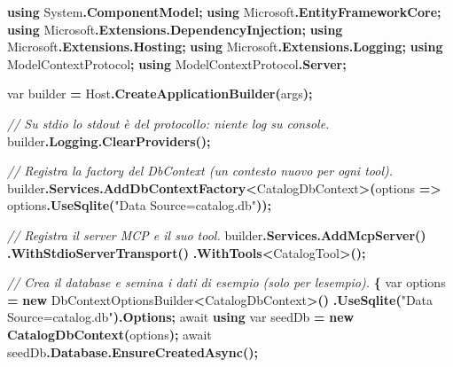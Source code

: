 \documentclass[
  italian,
  10pt,
]{book}
\newenvironment{Shaded}{\begin{snugshade}}{\end{snugshade}}
\newcommand{\CommentTok}[1]{\textcolor[rgb]{0.56,0.35,0.01}{\textit{#1}}}
\newcommand{\DataTypeTok}[1]{\textcolor[rgb]{0.13,0.29,0.53}{#1}}
\newcommand{\FunctionTok}[1]{\textcolor[rgb]{0.13,0.29,0.53}{\textbf{#1}}}
\newcommand{\KeywordTok}[1]{\textcolor[rgb]{0.13,0.29,0.53}{\textbf{#1}}}
\newcommand{\NormalTok}[1]{#1}
\newcommand{\OperatorTok}[1]{\textcolor[rgb]{0.81,0.36,0.00}{\textbf{#1}}}
\newcommand{\StringTok}[1]{\textcolor[rgb]{0.31,0.60,0.02}{#1}}
\begin{document}
\begin{Shaded}
\begin{Highlighting}[]
\KeywordTok{using}\NormalTok{ System}\OperatorTok{.}\FunctionTok{ComponentModel}\OperatorTok{;}
\KeywordTok{using}\NormalTok{ Microsoft}\OperatorTok{.}\FunctionTok{EntityFrameworkCore}\OperatorTok{;}
\KeywordTok{using}\NormalTok{ Microsoft}\OperatorTok{.}\FunctionTok{Extensions}\OperatorTok{.}\FunctionTok{DependencyInjection}\OperatorTok{;}
\KeywordTok{using}\NormalTok{ Microsoft}\OperatorTok{.}\FunctionTok{Extensions}\OperatorTok{.}\FunctionTok{Hosting}\OperatorTok{;}
\KeywordTok{using}\NormalTok{ Microsoft}\OperatorTok{.}\FunctionTok{Extensions}\OperatorTok{.}\FunctionTok{Logging}\OperatorTok{;}
\KeywordTok{using}\NormalTok{ ModelContextProtocol}\OperatorTok{;}
\KeywordTok{using}\NormalTok{ ModelContextProtocol}\OperatorTok{.}\FunctionTok{Server}\OperatorTok{;}

\DataTypeTok{var}\NormalTok{ builder }\OperatorTok{=}\NormalTok{ Host}\OperatorTok{.}\FunctionTok{CreateApplicationBuilder}\OperatorTok{(}\NormalTok{args}\OperatorTok{);}

\CommentTok{// Su stdio lo stdout è del protocollo: niente log su console.}
\NormalTok{builder}\OperatorTok{.}\FunctionTok{Logging}\OperatorTok{.}\FunctionTok{ClearProviders}\OperatorTok{();}

\CommentTok{// Registra la factory del DbContext (un contesto nuovo per ogni tool).}
\NormalTok{builder}\OperatorTok{.}\FunctionTok{Services}\OperatorTok{.}\FunctionTok{AddDbContextFactory}\OperatorTok{\textless{}}\NormalTok{CatalogDbContext}\OperatorTok{\textgreater{}(}\NormalTok{options }\OperatorTok{=\textgreater{}}
\NormalTok{    options}\OperatorTok{.}\FunctionTok{UseSqlite}\OperatorTok{(}\StringTok{"Data Source=catalog.db"}\OperatorTok{));}

\CommentTok{// Registra il server MCP e il suo tool.}
\NormalTok{builder}\OperatorTok{.}\FunctionTok{Services}\OperatorTok{.}\FunctionTok{AddMcpServer}\OperatorTok{()}
    \OperatorTok{.}\FunctionTok{WithStdioServerTransport}\OperatorTok{()}
    \OperatorTok{.}\FunctionTok{WithTools}\OperatorTok{\textless{}}\NormalTok{CatalogTool}\OperatorTok{\textgreater{}();}

\CommentTok{// Crea il database e semina i dati di esempio (solo per l\textquotesingle{}esempio).}
\OperatorTok{\{}
    \DataTypeTok{var}\NormalTok{ options }\OperatorTok{=} \KeywordTok{new}\NormalTok{ DbContextOptionsBuilder}\OperatorTok{\textless{}}\NormalTok{CatalogDbContext}\OperatorTok{\textgreater{}()}
        \OperatorTok{.}\FunctionTok{UseSqlite}\OperatorTok{(}\StringTok{"Data Source=catalog.db"}\OperatorTok{).}\FunctionTok{Options}\OperatorTok{;}
\NormalTok{    await }\KeywordTok{using} \DataTypeTok{var}\NormalTok{ seedDb }\OperatorTok{=} \KeywordTok{new} \FunctionTok{CatalogDbContext}\OperatorTok{(}\NormalTok{options}\OperatorTok{);}
\NormalTok{    await seedDb}\OperatorTok{.}\FunctionTok{Database}\OperatorTok{.}\FunctionTok{EnsureCreatedAsync}\OperatorTok{();}


\end{Highlighting}
\end{Shaded}
\end{document}
